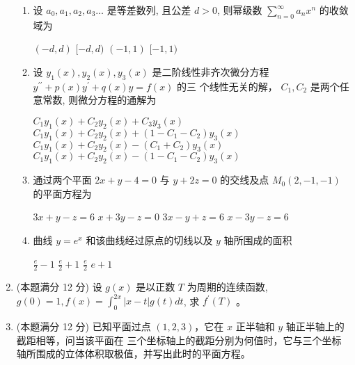 \begin{enumerate}
\begin{enumerate}
\item 
设 $a_{0}, a_{1}, a_{2},a_{3} \ldots$ 是等差数列, 且公差 $d>0$, 则幂级数 $\sum\limits_{n=0}^{\infty} a_{n} x^{n}$ 的收敛域为 

	

\fourchoices
{$(-d, d)$}
{$[-d, d)$}
{$(-1,1)$}
{$[-1,1)$}


\item 
设 $y_{1}(x), y_{2}(x), y_{3}(x)$ 是二阶线性非齐次微分方程 $y^{\prime \prime}+p(x) y^{\prime}+q(x) y=f(x)$ 的三 个线性无关的解， $C_{1}, C_{2}$ 是两个任意常数, 则微分方程的通解为  

\fourchoices
{$C_{1} y_{1}(x)+C_{2} y_{2}(x)+C_{3} y_{3}(x)$}
{$C_{1} y_{1}(x)+C_{2} y_{2}(x)+\left(1-C_{1}-C_{2}\right) y_{3}(x)$}
{$C_{1} y_{1}(x)+C_{2} y_{2}(x)-\left(C_{1}+C_{2}\right) y_{3}(x)$}
{$C_{1} y_{1}(x)+C_{2} y_{2}(x)-\left(1-C_{1}-C_{2}\right) y_{3}(x)$}

\item 
通过两个平面 $2 x+y-4=0$ 与 $y+2 z=0$ 的交线及点 $M_{0}(2,-1,-1)$ 的平面方程为  


\fourchoices
{$3 x+y-z=6$}
{$x+3 y-z=0$}
{$3 x-y+z=6$}
{$x-3 y-z=6$}

\item 
曲线 $y=e^{x}$ 和该曲线经过原点的切线以及 $y$ 轴所围成的面积  


\fourchoices
{$\frac{e}{2}-1$}
{$\frac{e}{2}+1$}
{$\frac{e}{2}$}
{$e+1$}


	
\end{enumerate}


\item 
(本题满分 12 分)
设 $g(x)$ 是以正数 $T$ 为周期的连续函数, $g(0)=1, f(x)=\int_{0}^{2 x}|x-t| g(t) d t$, 求 $f^{\prime}(T)$ 。




\item 
(本题满分 12 分)
已知平面过点 $ (1,2,3) $，它在 $ x $ 正半轴和 $ y $ 轴正半轴上的截距相等，问当该平面在
三个坐标轴上的截距分别为何值时，它与三个坐标轴所围成的立体体积取极值，并写出此时的平面方程。







\end{enumerate}
